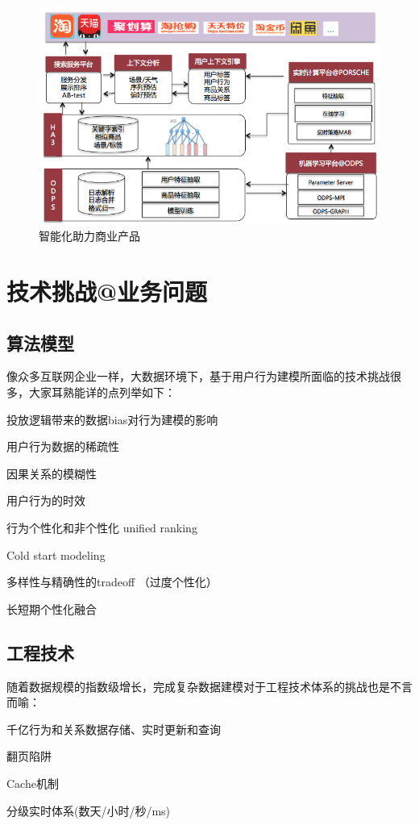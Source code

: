 \begin{figure}[h]
\centering
\includegraphics[totalheight=3.0in]{fig/techForBusiness.png}
\caption{智能化助力商业产品} \label{fig:gansamples}
\end{figure}

\section{技术挑战@业务问题} 
\subsection{算法模型} 
像众多互联网企业一样，大数据环境下，基于用户行为建模所面临的技术挑战很多，大家耳熟能详的点列举如下： 
\begin{description}
	\item 投放逻辑带来的数据bias对行为建模的影响
	\item 用户行为数据的稀疏性
	\item 因果关系的模糊性
	\item 用户行为的时效
	\item 行为个性化和非个性化 unified ranking
	\item Cold start modeling
	\item 多样性与精确性的tradeoff （过度个性化）
	\item 长短期个性化融合
\end{description}

\subsection{工程技术} 
随着数据规模的指数级增长，完成复杂数据建模对于工程技术体系的挑战也是不言而喻： 
\begin{description}
	\item 千亿行为和关系数据存储、实时更新和查询
	\item 翻页陷阱
	\item Cache机制
	\item 分级实时体系(数天/小时/秒/ms)
\end{description}


